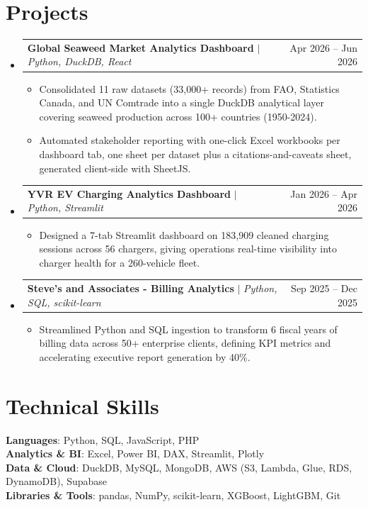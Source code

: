 \documentclass[letterpaper,11pt]{article}
\makeatletter
\newcommand{\resumeItem}[1]{
  \item\small{
    {#1 \vspace{-2pt}}
  }
}
\newcommand{\resumeProjectHeading}[2]{
    \item
    \begin{tabular*}{0.97\textwidth}{l@{\extracolsep{\fill}}r}
      \small#1 & #2 \\
    \end{tabular*}\vspace{-7pt}
}
\newcommand{\resumeSubHeadingListStart}{\begin{itemize}[leftmargin=0.15in, label={}]}
\newcommand{\resumeSubHeadingListEnd}{\end{itemize}}
\newcommand{\resumeItemListStart}{\begin{itemize}}
\newcommand{\resumeItemListEnd}{\end{itemize}\vspace{-5pt}}
\makeatother
\begin{document}
\section{Projects}
    \resumeSubHeadingListStart
      \resumeProjectHeading
          {\textbf{Global Seaweed Market Analytics Dashboard} $|$ \emph{Python, DuckDB, React}}{Apr 2026 -- Jun 2026}
          \resumeItemListStart
            \resumeItem{Consolidated 11 raw datasets (33,000+ records) from FAO, Statistics Canada, and UN Comtrade into a single DuckDB analytical layer covering seaweed production across 100+ countries (1950-2024).}
            \resumeItem{Automated stakeholder reporting with one-click Excel workbooks per dashboard tab, one sheet per dataset plus a citations-and-caveats sheet, generated client-side with SheetJS.}
          \resumeItemListEnd
      \resumeProjectHeading
          {\textbf{YVR EV Charging Analytics Dashboard} $|$ \emph{Python, Streamlit}}{Jan 2026 -- Apr 2026}
          \resumeItemListStart
            \resumeItem{Designed a 7-tab Streamlit dashboard on 183,909 cleaned charging sessions across 56 chargers, giving operations real-time visibility into charger health for a 260-vehicle fleet.}
          \resumeItemListEnd
      \resumeProjectHeading
          {\textbf{Steve's and Associates - Billing Analytics} $|$ \emph{Python, SQL, scikit-learn}}{Sep 2025 -- Dec 2025}
          \resumeItemListStart
            \resumeItem{Streamlined Python and SQL ingestion to transform 6 fiscal years of billing data across 50+ enterprise clients, defining KPI metrics and accelerating executive report generation by 40\%.}
          \resumeItemListEnd
    \resumeSubHeadingListEnd

\section{Technical Skills}
 \begin{itemize}[leftmargin=0.15in, label={}]
    \small{\item{
     \textbf{Languages}{: Python, SQL, JavaScript, PHP} \\
     \textbf{Analytics \& BI}{: Excel, Power BI, DAX, Streamlit, Plotly} \\
     \textbf{Data \& Cloud}{: DuckDB, MySQL, MongoDB, AWS (S3, Lambda, Glue, RDS, DynamoDB), Supabase} \\
     \textbf{Libraries \& Tools}{: pandas, NumPy, scikit-learn, XGBoost, LightGBM, Git}
    }}
 \end{itemize}

\end{document}
